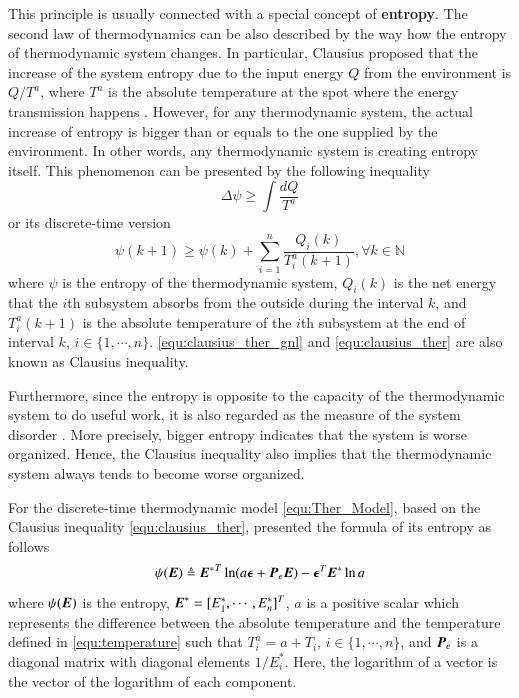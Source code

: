 \documentclass[preprint,authoryear,12pt]{elsarticle}
\renewcommand{\vec}[1]{\mbox{\boldmath$#1$}}
\newcommand{\mat}[1]{\mbox{\boldmath$#1$}}
\begin{document}
This principle is usually connected with a special concept of \textbf{entropy}. The second law of thermodynamics can be also described by the way how the entropy of thermodynamic system changes.
In particular, Clausius proposed that the increase of the system entropy due to the input energy $Q$ from the environment is $Q/T^a$, where $T^a$ is the absolute temperature at the spot where the energy transmission happens \citep{clausius_mechanical_1867}. However, for any thermodynamic system, the actual increase of entropy is bigger than or equals to the one supplied by the environment. In other words, any thermodynamic system is creating entropy itself. This phenomenon can be presented by the following inequality
\begin{equation}\label{equ:clausius_ther_gnl}
\Delta \psi \ge \int\frac{dQ}{T^a}
\end{equation}
or its discrete-time version \citep{haddad_thermodynamic_2005}
\begin{equation}\label{equ:clausius_ther}
\psi(k+1) \ge \psi(k)+\sum_{i=1}^{n}\frac{Q_i(k)}{T^a_i(k+1)},
\forall k\in\mathbb{N}
\end{equation}
where $\psi$ is the entropy of the thermodynamic system, $Q_i(k)$ is the net energy that the $i$th subsystem absorbs from the outside during the interval $k$, and $T^a_i(k+1)$ is the absolute temperature of the $i$th subsystem at the end of interval $k$, $i\in\{1,\cdots,n\}$. \eqref{equ:clausius_ther_gnl} and \eqref{equ:clausius_ther} are also known as Clausius inequality.

Furthermore, since the entropy is opposite to the capacity of the thermodynamic system to do useful work, it is also regarded as the measure of the system disorder \citep{balmakov_entropy_2001}. More precisely, bigger entropy indicates that the system is worse organized. Hence, the Clausius inequality also implies that the thermodynamic system always tends to become worse organized.

For the discrete-time thermodynamic model \eqref{equ:Ther_Model}, based on the Clausius inequality \eqref{equ:clausius_ther}, \citet{haddad_thermodynamic_2005} presented the formula of its entropy as follows
\begin{equation}
\psi(\vec{E}) \triangleq{\vec{E}^*}^T \ln
(a\vec{\epsilon}+\mat{P}_e\vec{E}) -\vec{\epsilon}^T\vec{E}^*\ln a
\label{equ:Ther_entropy}
\end{equation}
where $\psi(\vec{E})$ is the entropy, $\vec{E}^*=[E^*_1,\cdots,E^*_n]^T$, $a$ is a positive scalar which represents the difference between the absolute temperature and the temperature defined in \eqref{equ:temperature} such that $T^a_i=a+T_i$, $i\in\{1,\cdots,n\}$, and $\mat{P}_e$ is a diagonal matrix with diagonal elements $1/E^*_i$. Here, the logarithm of a vector is the vector of the logarithm of each component.
\end{document}
